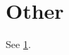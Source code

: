 \documentclass{article}
\begin{document}
\section{Other}\label{sec:intro} See \ref{sec:intro}.
\end{document}
